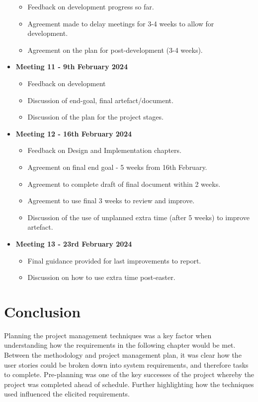 \begin{itemize}
\begin{itemize}
        \item Feedback on development progress so far.
        \item Agreement made to delay meetings for 3-4 weeks to allow for development.
        \item Agreement on the plan for post-development (3-4 weeks).
    \end{itemize}
    \item \textbf{Meeting 11 - 9th February 2024}
    \begin{itemize}
        \item Feedback on development
        \item Discussion of end-goal, final artefact/document.
        \item Discussion of the plan for the project stages.
    \end{itemize}
    \item \textbf{Meeting 12 - 16th February 2024}
    \begin{itemize}
        \item Feedback on Design and Implementation chapters.
        \item Agreement on final end goal - 5 weeks from 16th February.
        \item Agreement to complete draft of final document within 2 weeks.
        \item Agreement to use final 3 weeks to review and improve.
        \item Discussion of the use of unplanned extra time (after 5 weeks) to improve artefact.
    \end{itemize}
    \item \textbf{Meeting 13 - 23rd February 2024}
    \begin{itemize}
        \item Final guidance provided for last improvements to report.
        \item Discussion on how to use extra time post-easter.
    \end{itemize}
\end{itemize}

\section{Conclusion}
\label{pm:conclusion}

Planning the project management techniques was a key factor when understanding how the requirements in the following chapter would be met. Between the methodology and project management plan, it was clear how the user stories could be broken down into system requirements, and therefore tasks to complete. Pre-planning was one of the key successes of the project whereby the project was completed ahead of schedule. Further highlighting how the techniques used influenced the elicited requirements.